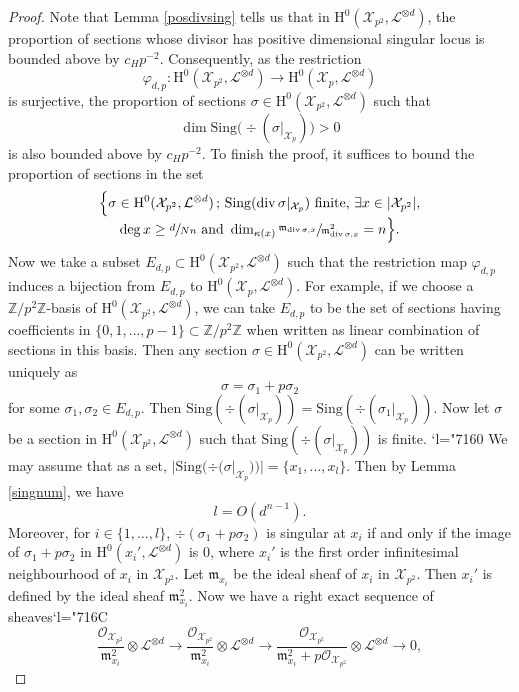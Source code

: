 \documentclass[11pt]{article}
\numberwithin{equation}{section}
\newcommand{\Changel}{\mathcode`l="7160}
\newcommand{\Changelback}{\mathcode`l="716C}
\newcommand{\sep}{\,;\,}
\theoremstyle{plain}
\theoremstyle{definition}
\newcommand{\ho}{\mathrm{H}}
\newcommand{\X}{\mathcal{X}}
\newcommand{\li}{\mathcal{L}}
\newcommand{\Z}{\mathbb{Z}}
\begin{document}
\begin{proof}
Note that Lemma \ref{posdivsing} tells us that in $\ho^0(\X_{p^2}, \li^{\otimes d})$, the proportion of sections whose divisor has positive dimensional singular locus is bounded above by $c_Hp^{-2}$. Consequently, as the restriction
\[
\varphi_{d,p}: \ho^0(\X_{p^2}, \li^{\otimes d}) \to \ho^0(\X_p, \li^{\otimes d})
\]
is surjective, the proportion of sections $\sigma\in \ho^0(\X_{p^2}, \li^{\otimes d})$ such that
\[
\dim\mathrm{Sing}\big(\div (\sigma|_{\X_p})\big)>0
\]
is also bounded above by $c_Hp^{-2}$. To finish the proof, it suffices to bound the proportion of sections in the set
\begin{multline*}
\Bigl\{ \sigma\in \ho^0(\X_{p^2}, \li^{\otimes d})\sep \mathrm{Sing}(\div \sigma|_{\X_p}) \text{ finite,}\ \exists x\in |\X_{p^2}|,\\[-3pt] \deg x \geq\sfrac{d}{Nn}\text{ and } \dim_{\kappa(x)}\sfrac{\mathfrak{m}_{\div \sigma,x}}{\mathfrak{m}_{\div \sigma,x}^2}=n \Bigr\}.
\end{multline*}
Now we take a subset $E_{d,p}\subset \ho^0(\X_{p^2}, \li^{\otimes d})$ such that the restriction map $\varphi_{d,p}$ induces a bijection from $E_{d,p}$ to $\ho^0(\X_p, \li^{\otimes d})$. For example, if we choose a $\Z/p^2\Z$-basis of $\ho^0(\X_{p^2}, \li^{\otimes d})$, we can take $E_{d,p}$ to be the set of sections having coefficients in $\{0,1,\dots, p-1\}\subset \Z/p^2\Z$ when written as linear combination of sections in this basis. Then any section $\sigma\in\ho^0(\X_{p^2}, \li^{\otimes d})$ can be written uniquely as
\[
\sigma=\sigma_1+p\sigma_2
\]
for some $\sigma_1,\sigma_2\in E_{d,p}$. Then $\mathrm{Sing}(\div (\sigma|_{\X_p})) =\mathrm{Sing}(\div (\sigma_1|_{\X_p})) $. Now let $\sigma$ be a section in $ \ho^0(\X_{p^2}, \li^{\otimes d})$ such that $\mathrm{Sing}(\div (\sigma|_{\X_p}))$ is finite.
\Changel
We may assume that as a set, $|\mathrm{Sing}(\div (\sigma|_{\X_p}))|=\{ x_1,\dots, x_l \}$. Then by Lemma \ref{singnum}, we have
\[
l=O(d^{n-1}).
\]
Moreover, for $i\in\{1,\dots, l \}$, $\div (\sigma_1+p\sigma_2)$ is singular at $x_i$ if and only if the image of $\sigma_1+p\sigma_2$ in $\ho^0(x_i', \li^{\otimes d})$ is $0$, where $x_i'$ is the first order infinitesimal neighbourhood of $x_i$ in $\X_{p^2}$. Let $\mathfrak{m}_{x_i}$ be the ideal sheaf of $x_i$ in $\X_{p^2}$. Then $x_i'$ is defined by the ideal sheaf $\mathfrak{m}_{x_i}^2$. Now we have a right exact sequence of sheaves\Changelback
\[
\frac{\mathcal{O}_{\X_{p^2}}}{\mathfrak{m}_{x_i}^2}\otimes \li^{\otimes d} \to \frac{\mathcal{O}_{\X_{p^2}}}{\mathfrak{m}_{x_i}^2}\otimes \li^{\otimes d} \to \frac{\mathcal{O}_{\X_{p^2}}}{\mathfrak{m}_{x_i}^2+p\mathcal{O}_{\X_{p^2}}}\otimes \li^{\otimes d}\to 0,
\]
\end{proof}
\end{document}
